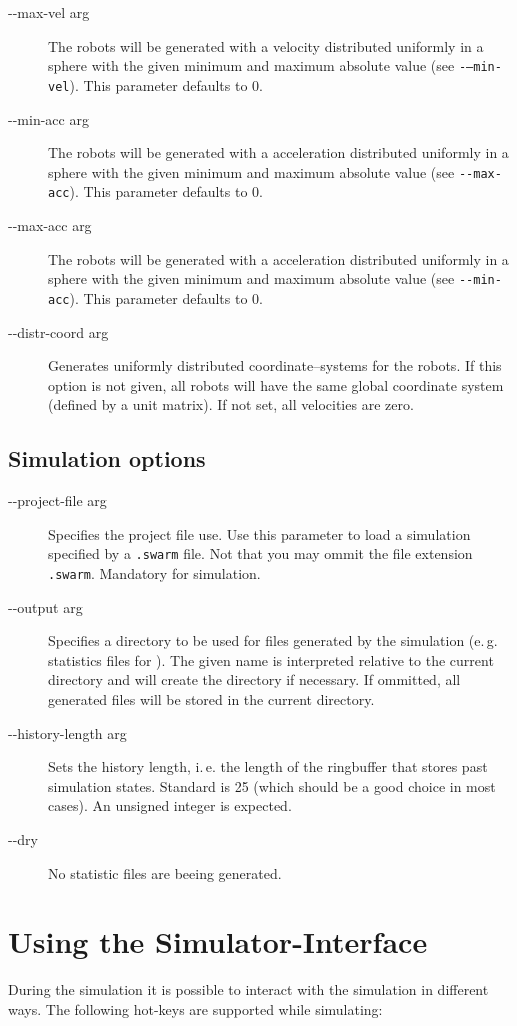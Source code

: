 \begin{description}
	\item [-{}-max-vel arg] The robots will be generated with a velocity distributed uniformly in a sphere with the given minimum and maximum absolute value (see {\tt -{}---min-vel}). This parameter defaults to 0.
	\item [-{}-min-acc arg] The robots will be generated with a acceleration distributed uniformly in a sphere with the given minimum and maximum absolute value (see {\tt -{}-max-acc}). This parameter defaults to 0.
	\item [-{}-max-acc arg] The robots will be generated with a acceleration distributed uniformly in a sphere with the given minimum and maximum absolute value (see {\tt -{}-min-acc}). This parameter defaults to 0.
	\item [-{}-distr-coord arg] Generates uniformly distributed coordinate--systems for the robots. If this option is not given, all robots will have the same global coordinate system (defined by a unit matrix).
 If not set, all velocities are zero.
\end{description}

\subsection{Simulation options}
\begin{description}
	\item [-{}-project-file arg] Specifies the project file use. Use this parameter to load a simulation specified by a {\tt .swarm} file. Not that you may ommit the file extension {\tt .swarm}. Mandatory for simulation.
	\item [-{}-output arg] Specifies a directory to be used for files generated by the simulation (e.\,g. statistics files for \gnuplot). The given name is interpreted relative to the current directory and will create the directory if necessary. If ommitted, all generated files will be stored in the current directory.
	\item [-{}-history-length arg] Sets the history length, i.\,e. the length of the ringbuffer that stores past simulation states. Standard is 25 (which should be a good choice in most cases). An unsigned integer is expected.
	\item [-{}-dry] No statistic files are beeing generated.
\end{description}


\section{Using the Simulator-Interface}
During the simulation it is possible to interact with the simulation in different ways. The following hot-keys are supported while simulating:

